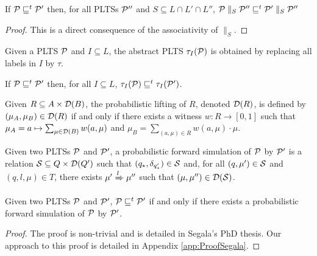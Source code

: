 \begin{lemma}
    \label{lem:precong}
    If $\mathcal{P} \sqsubseteq^t \mathcal{P}'$ then, for all PLTSs $\mathcal{P}''$ and
    $S \subseteq L \cap L' \cap L''$,
    $\mathcal{P} \parallel_S \mathcal{P}'' \sqsubseteq^t \mathcal{P}' \parallel_S \mathcal{P}''$
\end{lemma}
\begin{proof}
    This is a direct consequence of the associativity of $\parallel_S$.
\end{proof}

\begin{definition}
    Given a PLTS $\mathcal{P}$ and $I \subseteq L$, the abstract PLTS $\tau_I(\mathcal{P})$ is obtained
    by replacing all labels in $I$ by $\tau$.
\end{definition}

\begin{lemma}
    \label{lem:abstract}
    If $\mathcal{P} \sqsubseteq^t \mathcal{P}'$ then, for all $I \subseteq L$,
    $\tau_I(\mathcal{P}) \sqsubseteq^t \tau_I(\mathcal{P}')$.
\end{lemma}

Given $R \subseteq A \times \mathcal{D}(B)$, the probabilistic lifting of $R$, denoted $\mathcal{D}(R)$, is
defined by $(\mu_A,\mu_B) \in \mathcal{D}(R)$ if and only if there exists a witness $w : R \rightarrow 
[0,1]$ such that $\mu_A = a \mapsto \sum_{\mu \in \mathcal{D}(B)}w(a,\mu)$ and $\mu_B = \sum_{(a, \mu) 
\in R}w(a,\mu)\cdot\mu$.

\begin{definition}

    Given two PLTSs $\mathcal{P}$ and $\mathcal{P}'$, a probabilistic forward simulation of $\mathcal{P}$ by $\mathcal{P}'$
    is a relation $\mathcal{S} \subseteq Q \times \mathcal{D}(Q')$ such that
    $(q_\star,\delta_{q_\star'}) \in \mathcal{S}$ and, for all $(q,\mu') \in \mathcal{S}$ and $(q,l,\mu) \in T$,
    there exists $\mu' \xRightarrow{l} \mu''$ such that $(\mu,\mu'') \in \mathcal{D}(\mathcal{S})$.
\end{definition}

\begin{theorem}
    \label{thm:Segala}
    Given two PLTSs $\mathcal{P}$ and $\mathcal{P}'$, $\mathcal{P} \sqsubseteq^t \mathcal{P}'$ if and only if there exists a
    probabilistic forward simulation of $\mathcal{P}$ by $\mathcal{P}'$.
\end{theorem}
\begin{proof}
    The proof is non-trivial and is detailed in Segala's PhD thesis.
    Our approach to this proof is detailed in Appendix \ref{app:ProofSegala}.
\end{proof}

